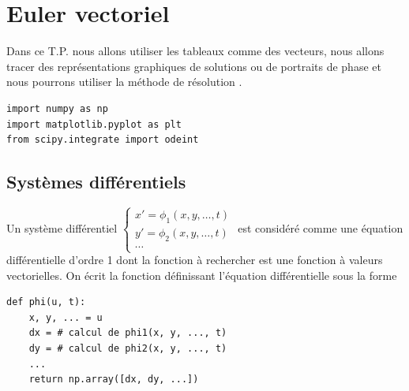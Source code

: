 \chapter{Euler vectoriel}
\thispagestyle{empty}


Dans ce T.P. nous allons utiliser les tableaux  comme des vecteurs, nous allons tracer des représentations graphiques de solutions ou de portraits de phase et nous pourrons utiliser la méthode de résolution .
\begin{lstlisting}
import numpy as np
import matplotlib.pyplot as plt
from scipy.integrate import odeint
\end{lstlisting}
\section{Systèmes différentiels}
Un système différentiel
$\displaystyle \left\{\begin{matrix}
x' = \phi_1(x, y, \ldots, t)\\
y' = \phi_2(x, y, \ldots, t)\\
\cdots
\end{matrix}\right.$
est considéré comme une équation différentielle d'ordre 1 dont la fonction à rechercher est une fonction à valeurs vectorielles. On écrit la fonction définissant l'équation différentielle sous la forme
\begin{lstlisting}
def phi(u, t):
    x, y, ... = u
    dx = # calcul de phi1(x, y, ..., t)
    dy = # calcul de phi2(x, y, ..., t)
    ...
    return np.array([dx, dy, ...])
\end{lstlisting}

